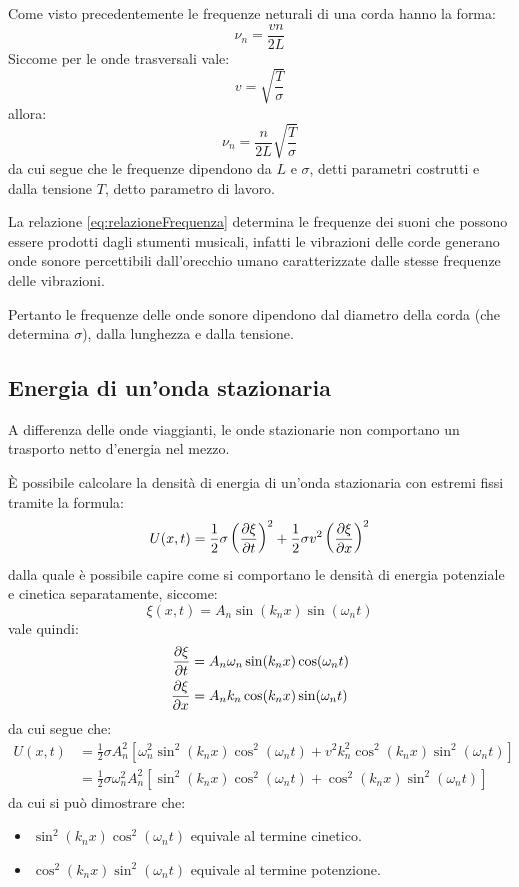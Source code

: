 \documentclass[11pt, a4paper, openright]{book}
\theoremstyle{plain}
\theoremstyle{definition}
\begin{document}
Come visto precedentemente le frequenze neturali di una corda hanno la forma:
\begin{equation}
    \nu_n = \frac{vn}{2L}
\end{equation}
Siccome per le onde trasversali vale:
\begin{equation}
    v = \sqrt{\frac{T}{\sigma}}
\end{equation}
allora:
\begin{equation}
    \nu_n = \frac{n}{2L}\sqrt{\frac{T}{\sigma}}
    \label{eq:relazioneFrequenza}
\end{equation}
da cui segue che le frequenze dipendono da $L$ e $\sigma$, detti parametri costrutti e dalla tensione $T$, detto parametro di lavoro.

La relazione \ref{eq:relazioneFrequenza} determina le frequenze dei suoni che possono essere prodotti dagli stumenti musicali, infatti le vibrazioni delle corde generano onde sonore percettibili dall'orecchio umano caratterizzate dalle stesse frequenze delle vibrazioni.

Pertanto le frequenze delle onde sonore dipendono dal diametro della corda (che determina $\sigma$), dalla lunghezza e dalla tensione.


\subsection{Energia di un'onda stazionaria}
A differenza delle onde viaggianti, le onde stazionarie non comportano un trasporto netto d'energia nel mezzo.

È possibile calcolare la densità di energia di un'onda stazionaria con estremi fissi tramite la formula:
\begin{equation}
    U(x, t) = \frac{1}{2}\sigma\left(\pdv{\xi}{t}\right)^2 + \frac{1}{2}\sigma v^2 \left(\pdv{\xi}{x}\right)^2
\end{equation}
dalla quale è possibile capire come si comportano le densità di energia potenziale e cinetica separatamente, siccome:
\begin{equation}
    \xi(x, t) = A_n \sin(k_n x)\sin(\omega_n t)
\end{equation}
vale quindi:
\begin{align}
    \pdv{\xi}{t} & = A_n\omega_n\sin(k_nx)\cos(\omega_nt) \\
    \pdv{\xi}{x} & = A_nk_n\cos(k_nx)\sin(\omega_nt)
\end{align}
da cui segue che:
\begin{align}
    U(x, t) & = \frac{1}{2}\sigma A_n^2\left[\omega_n^2\sin^2(k_nx)\cos^2(\omega_nt) + v^2k_n^2\cos^2(k_nx)\sin^2(\omega_nt)\right] \\
            & = \frac{1}{2}\sigma \omega_n^2 A_n^2\left[\sin^2(k_nx)\cos^2(\omega_nt) + \cos^2(k_nx)\sin^2(\omega_nt)\right]
\end{align}
da cui si può dimostrare che:
\begin{itemize}
    \item $\sin^2(k_nx)\cos^2(\omega_nt)$ equivale al termine cinetico.
    \item $\cos^2(k_nx)\sin^2(\omega_nt)$ equivale al termine potenzione.
\end{itemize}
\end{document}

